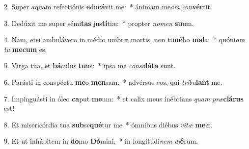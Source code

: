 2. Super aquam refectiónis \textbf{e}du\textbf{cá}vit me:~*  ánimam me\textit{am} \textit{con}\textbf{vér}tit.\

3. Dedúxit me super sémi\textbf{tas} jus\textbf{tí}tiæ:~*  propter \textit{no}\textit{men} \textbf{su}um.\

4. Nam, etsi ambulávero in médio umbræ mortis, non ti\textbf{mé}bo \textbf{ma}la:~*  quóni\textit{am} \textit{tu} \textbf{me}\textbf{cum} es.\

5. Virga tua, et \textbf{bá}culus \textbf{tu}us:~*  ipsa me \textit{con}\textit{so}\textbf{lá}\textbf{ta} sunt.\

6. Parásti in conspéctu \textbf{me}o \textbf{men}sam,~*  advérsus eos, qui \textit{trí}\textit{bu}\textbf{lant} me.\

7. Impinguásti in óleo \textbf{ca}put \textbf{me}um:~*  et calix meus inébrians \textit{quam} \textit{præ}\textbf{clá}\textbf{rus} est!\

8. Et misericórdia tua \textbf{sub}se\textbf{qué}tur me~*  ómnibus diébus \textit{vi}\textit{tæ} \textbf{me}æ.\

9. Et ut inhábitem in \textbf{do}mo \textbf{Dó}mini,~*  in longitúdi\textit{nem} \textit{di}\textbf{é}rum.\

